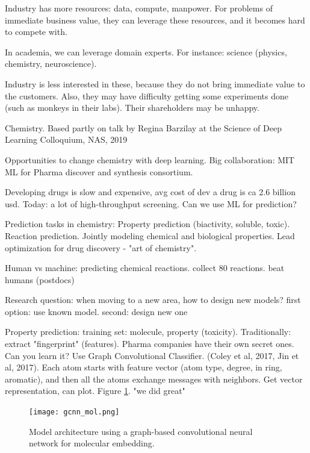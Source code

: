 \documentclass[english]{article}
\begin{document}
\benum 
\item Industry has more resources: data, compute, manpower. For problems of immediate business value, they can leverage these resources, and it becomes hard to compete with.
\item In academia, we can leverage domain experts. For instance: science (physics, chemistry, neuroscience). 

Industry is less interested in these, because they do not bring immediate value to the customers. Also, they may have difficulty getting some experiments done (such as monkeys in their labs). Their shareholders may be unhappy.

\item Chemistry. Based partly on talk by Regina Barzilay at the Science of Deep Learning Colloquium, NAS, 2019

Opportunities to change chemistry with deep learning. Big collaboration: MIT ML for Pharma discover and synthesis consortium.

Developing drugs is slow and expensive, avg cost of dev a drug is ca 2.6 billion usd. Today: a lot of high-throughput screening. Can we use ML for prediction?

Prediction tasks in chemistry: Property prediction (biactivity, soluble, toxic). Reaction prediction. Jointly modeling chemical and biological properties. Lead optimization for drug discovery - "art of chemistry".

Human vs machine:  predicting chemical reactions. collect 80 reactions. beat humans (postdocs)

Research question: when moving to a new area, how to design new models? first option: use known model. second: design new one

Property prediction: training set: molecule, property (toxicity). Traditionally: extract "fingerprint" (features). Pharma companies have their own secret ones. Can you learn it? Use Graph Convolutional Classifier. (Coley et al, 2017, Jin et al, 2017). Each atom starts with feature vector (atom type, degree, in ring, aromatic), and then all the atoms exchange messages with neighbors. Get vector representation, can plot. Figure \ref{gcnn_mol}. "we did great"  

\begin{figure}
  \centering
  \texttt{[image: gcnn\_mol.png]}
  \caption{Model architecture using a graph-based convolutional neural network for molecular embedding.}
  \label{gcnn_mol}
\end{figure}
\end{document}
